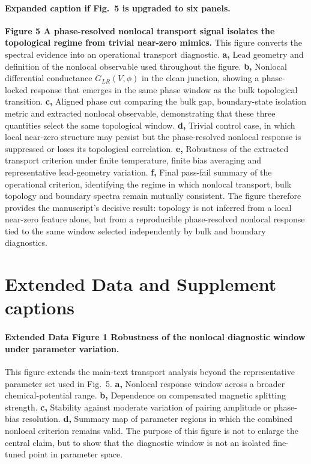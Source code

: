 \paragraph{Expanded caption if Fig.~5 is upgraded to six panels.}
\textbf{Figure 5 \textbar{} A phase-resolved nonlocal transport signal isolates the topological regime from trivial near-zero mimics.} This figure converts the spectral evidence into an operational transport diagnostic. \textbf{a,} Lead geometry and definition of the nonlocal observable used throughout the figure. \textbf{b,} Nonlocal differential conductance $G_{LR}(V,\phi)$ in the clean junction, showing a phase-locked response that emerges in the same phase window as the bulk topological transition. \textbf{c,} Aligned phase cut comparing the bulk gap, boundary-state isolation metric and extracted nonlocal observable, demonstrating that these three quantities select the same topological window. \textbf{d,} Trivial control case, in which local near-zero structure may persist but the phase-resolved nonlocal response is suppressed or loses its topological correlation. \textbf{e,} Robustness of the extracted transport criterion under finite temperature, finite bias averaging and representative lead-geometry variation. \textbf{f,} Final pass-fail summary of the operational criterion, identifying the regime in which nonlocal transport, bulk topology and boundary spectra remain mutually consistent. The figure therefore provides the manuscript's decisive result: topology is not inferred from a local near-zero feature alone, but from a reproducible phase-resolved nonlocal response tied to the same window selected independently by bulk and boundary diagnostics.

\section*{Extended Data and Supplement captions}

\paragraph{Extended Data Figure 1 \textbar{} Robustness of the nonlocal diagnostic window under parameter variation.}
This figure extends the main-text transport analysis beyond the representative parameter set used in Fig.~5. \textbf{a,} Nonlocal response window across a broader chemical-potential range. \textbf{b,} Dependence on compensated magnetic splitting strength. \textbf{c,} Stability against moderate variation of pairing amplitude or phase-bias resolution. \textbf{d,} Summary map of parameter regions in which the combined nonlocal criterion remains valid. The purpose of this figure is not to enlarge the central claim, but to show that the diagnostic window is not an isolated fine-tuned point in parameter space.

